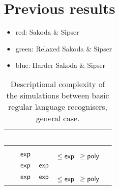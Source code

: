 \chapter{Previous results}

\begin{itemize}
	\item red: Sakoda \& Sipser
	\item green: Relaxed Sakoda \& Sipser
	\item blue: Harder Sakoda \& Sipser
\end{itemize}

\begin{table}
	\centering
	\renewcommand{\hstdef}{.35}
	\begin{tabular}{|l|l|l|p{2.9em}|l|}
		\hline
		~     & \ODFA   & \ONFA   & \TDFA                          & \TNFA  \\ \hline
		\ODFA & \cY     & \Ctriv  & \Ctriv                         & \Ctriv \\ \hline
		\ONFA & $\mathsf{exp}$ & \cY     & \cR $\le\Cexp\hst$ $\ge\mathsf{poly}$ & \Ctriv \\ \hline
		\TDFA & $\mathsf{exp}$ & $\mathsf{exp}$ & \cY                            & \Ctriv \\ \hline
		\TNFA & $\mathsf{exp}$ & $\mathsf{exp}$ & \cR $\le\Cexp\hst$ $\ge\mathsf{poly}$ & \cY    \\ \hline
	\end{tabular}
	\caption{Descriptional complexity of the simulations between basic regular language recognisers, general case.}
\end{table}

